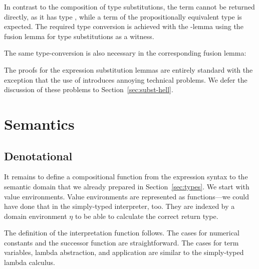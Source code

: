 \documentclass[acmsmall,anonymous,review,screen]{acmart}
\begin{document}
In contrast to the composition of type substitutions, the term
 cannot be returned directly,
as it has type ,
while a term of the propositionally equivalent type
 is expected.
The required type conversion is achieved with the {\Asubst}-lemma
using the fusion lemma for type substitutions as a witness.

The same type-conversion is also necessary in the corresponding fusion lemma:
\SubstExamplesFusionESubESub

The proofs for the expression substitution lemmas are entirely standard with the
exception that the use of {\Asubst} introduces annoying technical problems.
We defer the discussion of these problems to Section~\ref{sec:subst-hell}.


\section{Semantics}
\label{sec:semantics}

\subsection{Denotational}
\label{sec:denotational}



It remains to define a compositional function from the expression
syntax to the semantic domain that we already prepared in
Section~\ref{sec:types}. We start with value environments.
\TFVEnv
Value environments are represented as functions---we could have done
that in the simply-typed interpreter, too. They are indexed by a
domain environment $\eta$ to be able to calculate the correct return type.

The definition of the interpretation function follows.
\TFExprSem
The cases for numerical constants and the successor function are straightforward.
The cases for term variables, lambda abstraction, and application are
similar to the  simply-typed lambda calculus.
\end{document}
